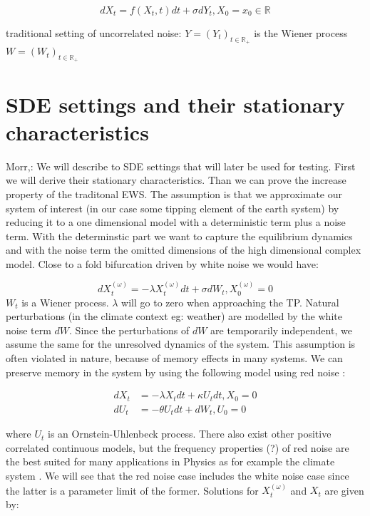 \documentclass[%
thesis=student,%
coverpage=false,%
titlepage=false,%
headmarks=true, %
german,%
font=libertine, %
math=newpxtx, %
BCOR=5mm,%
coverBCOR=11mm%
]{tumbook}
\begin{document}
\begin{equation}
    dX_{t} = f(X_{t},t)dt + \sigma dY_{t}, X_{0} = x_{0} \in \mathbb{R}
\end{equation}

traditional setting of uncorrelated noise: $Y = (Y_{t})_{t \in \mathbb{R}_{+}}$ is the Wiener process $W = (W_{t})_{t\in \mathbb{R}_{+}}$



\chapter{SDE settings and their stationary characteristics}

Morr,:
We will describe to SDE settings that will later be used for testing. First we will derive their stationary characteristics. Than we can prove the increase property of the traditonal EWS. The assumption is that we approximate our system of interest (in our case some tipping element of the earth system) by reducing it to a one dimensional model with a deterministic term plus a noise term. With the determinstic part we want to capture the equilibrium dynamics and with the noise term the omitted dimensions of the high dimensional complex model. Close to a fold bifurcation driven by white noise we would have:

\begin{equation}
        dX_{t}^{(\omega)} = -\lambda X_{t}^{(\omega)}dt + \sigma dW_{t}, X_{0}^{(\omega)} = 0 \label{eq: 2}
\end{equation}
$W_{t}$ is a Wiener process. $\lambda$ will go to zero when approaching the TP. Natural perturbations (in the climate context eg: weather) are modelled by the white noise term $dW$. Since the perturbations of $dW$ are temporarily independent, we assume the same for the unresolved dynamics of the system. This assumption is often violated in nature, because of memory effects in many systems. We can preserve memory in the system by using the following model using red noise \cite{Hanggi:1994,Morr:2022}:

\begin{subequations}
    \begin{align}
        dX_{t} &= -\lambda X_{t}dt + \kappa U_{t}dt, X_{0} = 0 \label{eq: 1a} \\
        dU_{t} &= -\theta U_{t}dt + dW_{t}, U_{0} = 0 \label{eq: 1b}
    \end{align}
\end{subequations}

where $U_{t}$ is an Ornstein-Uhlenbeck process. There also exist other positive correlated continuous models, but the frequency properties (?) of red noise are the best suited for many applications in Physics as for example the climate system \cite{Hasselmann:1976, Hanggi:1993, Liao:2022}. We will see that the red noise case includes the white noise case since the latter is a parameter limit of the former.
Solutions for $X_{t}^{(\omega)}$ and $X_{t}$ are given by:
\end{document}
